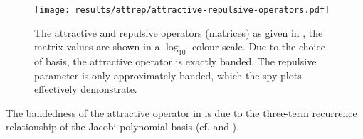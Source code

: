 \begin{figure}[H]
  \centering
  \texttt{[image: results/attrep/attractive-repulsive-operators.pdf]}
  \caption[Attractive and repulsive operators.]{The attractive and repulsive operators (matrices) as given in , the matrix values are shown in a $\log_{10}$ colour scale. Due to the choice of basis, the attractive operator is exactly banded. The repulsive parameter is only approximately banded, which the spy plots effectively demonstrate.}
  \label{fig:attractive-repulsive}
\end{figure}

The bandedness of the attractive operator in  is due to the three-term recurrence relationship of the Jacobi polynomial basis (cf.  and ).
